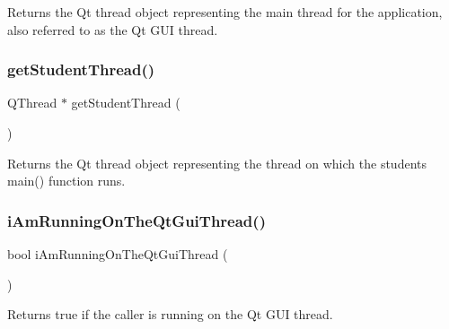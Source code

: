 Returns the Qt thread object representing the main thread for the application, also referred to as the Qt G\+UI thread. 

\mbox{\label{classGThread_ad230888eab766cd189ab09365776c41e}} 
\subsubsection{\texorpdfstring{get\+Student\+Thread()}{getStudentThread()}}
{\footnotesize\ttfamily Q\+Thread $\ast$ get\+Student\+Thread (\begin{DoxyParamCaption}{ }\end{DoxyParamCaption})\hspace{0.3cm}{\ttfamily [static]}}



Returns the Qt thread object representing the thread on which the student\textquotesingle{}s main() function runs. 

\mbox{\label{classGThread_a410c93ed2a5eb78ea24013ef35e49eed}} 
\subsubsection{\texorpdfstring{i\+Am\+Running\+On\+The\+Qt\+Gui\+Thread()}{iAmRunningOnTheQtGuiThread()}}
{\footnotesize\ttfamily bool i\+Am\+Running\+On\+The\+Qt\+Gui\+Thread (\begin{DoxyParamCaption}{ }\end{DoxyParamCaption})\hspace{0.3cm}{\ttfamily [static]}}



Returns true if the caller is running on the Qt G\+UI thread. 

\mbox{\label{classGThread_a3e60d512067e765b4e2d7c0c5bec39fa}} 
